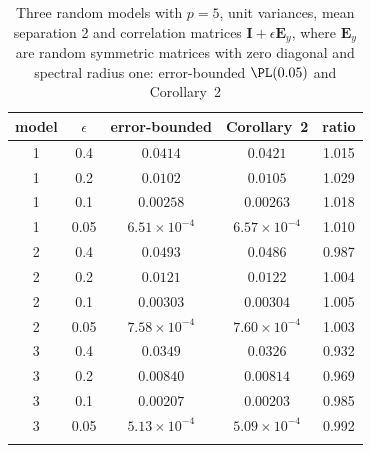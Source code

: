 \begin{table}[t]
\caption{Three random models with $p=5$, unit variances, mean separation 2 and correlation matrices $\bm I+\epsilon\bm E_y$, where $\bm E_y$ are random symmetric matrices with zero diagonal and spectral radius one: error-bounded $\PL(0.05)$ and Corollary~2}\label{tab:weakp5}
\small
\begin{tabular*}{\textwidth}{@{\extracolsep\fill}ccccc@{}}
\toprule
model & $\epsilon$ & error-bounded & Corollary~2 & ratio\\
\midrule
1 & 0.4 & $0.0414$ & $0.0421$ & 1.015\\
1 & 0.2 & $0.0102$ & $0.0105$ & 1.029\\
1 & 0.1 & $0.00258$ & $0.00263$ & 1.018\\
1 & 0.05 & $6.51\times10^{-4}$ & $6.57\times10^{-4}$ & 1.010\\
\midrule
2 & 0.4 & $0.0493$ & $0.0486$ & 0.987\\
2 & 0.2 & $0.0121$ & $0.0122$ & 1.004\\
2 & 0.1 & $0.00303$ & $0.00304$ & 1.005\\
2 & 0.05 & $7.58\times10^{-4}$ & $7.60\times10^{-4}$ & 1.003\\
\midrule
3 & 0.4 & $0.0349$ & $0.0326$ & 0.932\\
3 & 0.2 & $0.00840$ & $0.00814$ & 0.969\\
3 & 0.1 & $0.00207$ & $0.00203$ & 0.985\\
3 & 0.05 & $5.13\times10^{-4}$ & $5.09\times10^{-4}$ & 0.992\\
\botrule
\end{tabular*}
\end{table}
